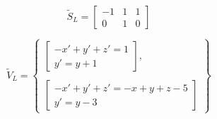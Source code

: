 \begin{center}
	\begin{minipage}{0.3\linewidth}
		\begin{equation*}
		\tilde{S}_L = 
			\begin{bmatrix}
				-1 & 1 & 1 \\
				0 & 1 & 0
			\end{bmatrix}
		\end{equation*}
	\end{minipage}
	\begin{minipage}{0.6\linewidth}
		\begin{equation*}
		    \tilde{V}_L =
		     \begin{Bmatrix}
		              \begin{bmatrix}
		                    -x' + y' + z' = 1 \\
		                    y' = y + 1
		               \end{bmatrix}, \\ \\
		               \begin{bmatrix}
		                     -x' + y' + z' = -x + y + z - 5 \\
		                    y' = y - 3
		               \end{bmatrix}
		    \end{Bmatrix}
		\end{equation*}
	\end{minipage}
\end{center}
